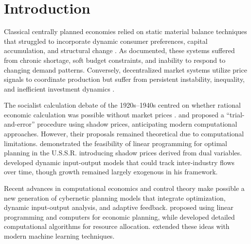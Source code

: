 \section{Introduction}
\label{sec:introduction}

Classical centrally planned economies relied on static material balance
techniques that struggled to incorporate dynamic consumer preferences,
capital accumulation, and structural change
\citep{montias1959planning,ellman1989socialist}.
As \citet{kornai1992socialist} documented, these systems suffered from
chronic shortage, soft budget constraints, and inability to respond to
changing demand patterns.
Conversely, decentralized market systems utilize price signals to
coordinate production but suffer from persistent instability,
inequality, and inefficient investment dynamics
\citep{kalecki1971selected,minsky1986stabilizing}.

The socialist calculation debate of the 1920s--1940s centred on whether
rational economic calculation was possible without market prices
\citep{mises1920economic,hayek1945use,lange1936economic}.
\citet{lange1936economic} and \citet{taylor1929guidance} proposed a
``trial-and-error'' procedure using shadow prices, anticipating modern
computational approaches.
However, their proposals remained theoretical due to computational
limitations.
\citet{kantorovich1965best} demonstrated the feasibility of linear
programming for optimal planning in the U.S.S.R. introducing
shadow prices derived from dual variables.
\citet{leontief1986input} developed dynamic input-output models that
could track inter-industry flows over time, though growth remained
largely exogenous in his framework.

Recent advances in computational economics and control theory
\citep{doyle1992feedback,astrom2010feedback} make possible a new
generation of cybernetic planning models that integrate optimization,
dynamic input-output analysis, and adaptive feedback.
\citet{cottrell1993towards} proposed using linear programming and
computers for economic planning, while \citet{cockshott2012economic}
developed detailed computational algorithms for resource allocation.
\citet{allin2020economic} extended these ideas with modern machine
learning techniques.


